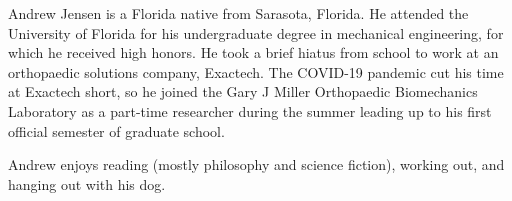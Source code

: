 Andrew Jensen is a Florida native from Sarasota, Florida. He attended the University of Florida for his undergraduate degree in mechanical engineering, for which he received high honors. He took a brief hiatus from school to work at an orthopaedic solutions company, Exactech. The COVID-19 pandemic cut his time at Exactech short, so he joined the Gary J Miller Orthopaedic Biomechanics Laboratory as a part-time researcher during the summer leading up to his first official semester of graduate school.

Andrew enjoys reading (mostly philosophy and science fiction), working out, and hanging out with his dog.
